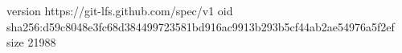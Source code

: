 version https://git-lfs.github.com/spec/v1
oid sha256:d59c8048e3fc68d384499723581bd916ac9913b293b5cf44ab2ae54976a5f2ef
size 21988
